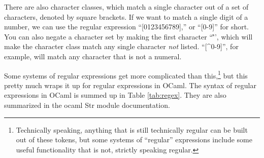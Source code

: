 \documentclass[10pt]{book}
\begin{document}
{There are also character classes, which match a single character out of a set of characters, denoted by square brackets. If we want to match a single digit of a number, we can use the regular expression ``[0123456789],'' or ``[0-9]'' for short. You can also negate a character set by making the first character ``\^'', which will make the character class match any single character {\em not} listed. ``[^0-9]'', for example, will match any character that is not a numeral.

Some systems of regular expressions get more complicated than this,\footnote{Technically speaking, anything that is still technically regular can be built out of these tokens, but some systems of ``regular'' expressions include some useful functionality that is not, strictly speaking regular.} but this pretty much wraps it up for regular expressions in OCaml. The syntax of regular expressions in OCaml is summed up in Table \ref{tab:regex}. They are also summarized in the ocaml Str module documentation.

}
\end{document}
